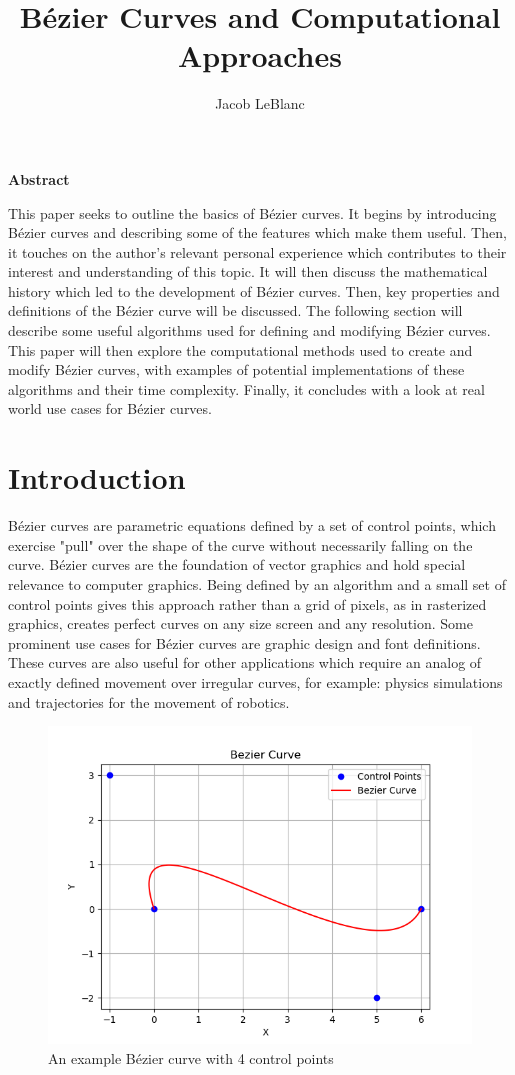 \documentclass{article}
\title{Bézier Curves and Computational Approaches}
\author{Jacob LeBlanc}
\begin{document}
\begin{titlepage}
\maketitle
\begin{center}
    \Large
    \textbf{Abstract}
\end{center}
\large
This paper seeks to outline the basics of Bézier curves. It begins by introducing Bézier curves and describing some of the features which make them useful. Then, it touches on the author's relevant personal experience which contributes to their interest and understanding of this topic. It will then discuss the mathematical history which led to the development of Bézier curves. Then, key properties and definitions of the Bézier curve will be discussed. The following section will describe some useful algorithms used for defining and modifying Bézier curves. This paper will then explore the computational methods used to create and modify Bézier curves, with examples of potential implementations of these algorithms and their time complexity. Finally, it concludes with a look at real world use cases for Bézier curves.
\end{titlepage}


\section{Introduction}
Bézier curves are parametric equations defined by a set of control points, which exercise "pull" over the shape of the curve without necessarily falling on the curve. Bézier curves are the foundation of vector graphics and hold special relevance to computer graphics. Being defined by an algorithm and a small set of control points gives this approach rather than a grid of pixels, as in rasterized graphics, creates perfect curves on any size screen and any resolution. Some prominent use cases for Bézier curves are graphic design and font definitions. These curves are also useful for other applications which require an analog of exactly defined movement over irregular curves, for example: physics simulations and trajectories for the movement of robotics.

\begin{figure}[h]
    \centering
    \includegraphics[width=0.5\linewidth]{Ex-Curve.png}
    \caption{An example Bézier curve with 4 control points}
    \label{fig:enter-label}
\end{figure}
\end{document}
